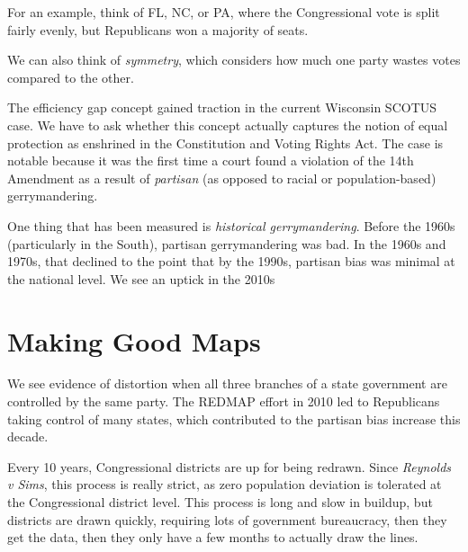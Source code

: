 
For an example, think of FL, NC, or PA, where the Congressional vote is split fairly evenly, but Republicans won a majority of seats.

We can also think of \textit{symmetry}, which considers how much one party wastes votes compared to the other.


The efficiency gap concept gained traction in the current Wisconsin SCOTUS case.  We have to ask whether this concept actually captures the notion of equal protection as enshrined in the Constitution and Voting Rights Act.  The case is notable because it was the first time a court found a violation of the 14th Amendment as a result of \textit{partisan} (as opposed to racial or population-based) gerrymandering.

One thing that has been measured is \textit{historical gerrymandering}.  Before the 1960s (particularly in the South), partisan gerrymandering was bad.  In the 1960s and 1970s, that declined to the point that by the 1990s, partisan bias was minimal at the national level.  We see an uptick in the 2010s

\section*{Making Good Maps}

We see evidence of distortion when all three branches of a state government are controlled by the same party.  The REDMAP effort in 2010 led to Republicans taking control of many states, which contributed to the partisan bias increase this decade.

Every 10 years, Congressional districts are up for being redrawn.  Since \textit{Reynolds v Sims}, this process is really strict, as zero population deviation is tolerated at the Congressional district level.  This process is long and slow in buildup, but districts are drawn quickly, requiring lots of government bureaucracy, then they get the data, then they only have a few months to actually draw the lines.

